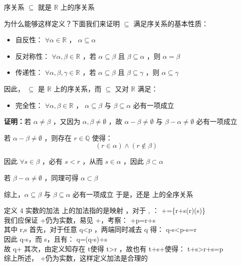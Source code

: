 \begin{definition}{序关系}
$\subseteq$ 就是 $\mathbb{R}$ 上的序关系
\end{definition}
为什么能够这样定义？下面我们来证明 $\subseteq$  满足序关系的基本性质：
\begin{itemize}
\item 自反性： $\forall \alpha\in\mathbb{R}$ ， $\alpha\subseteq\alpha$
\end{itemize}
\begin{itemize}
\item 
反对称性： $\forall \alpha,\beta\in\mathbb{R}$ ，若 $\alpha\subseteq\beta$ 且 $\beta\subseteq\alpha$ ，则 $\alpha=\beta$ 
\end{itemize}

\begin{itemize}
\item 传递性： $\forall \alpha,\beta,\gamma \in \mathbb{R}$ ，若 $\alpha\subseteq\beta$ 且 $\beta\subseteq\gamma$ ，则 $\alpha\subseteq\gamma$ 
\end{itemize}

因此， $\subseteq$ 是 $\mathbb{R}$ 上的序关系，而 $\subseteq$ 又对 $\mathbb{R}$ 满足：

\begin{itemize}
\item 完全性： $\forall \alpha,\beta \in\mathbb{R}$ ， $\alpha\subseteq \beta$  与 $\beta\subseteq \alpha$  必有一项成立
\end{itemize}

\textbf{证明：}若 $\alpha\neq\beta$ ，又因为 $\alpha,\beta\neq\emptyset$ ，故 $\alpha-\beta\neq \emptyset$ 与 $\beta-\alpha \neq \emptyset$ 必有一项成立

若 $\alpha-\beta\neq\emptyset$ ，则存在 $r\in\mathbb{Q}$ 使得：
$$(r\in\alpha)\wedge (r\notin\beta)$$

因此 $\forall s\in\beta$ ，必有 $s<r$ ，从而 $s\in\alpha$ ，因此 $\beta\subset \alpha$

若 $\beta-\alpha\neq\emptyset$ ，同理可得 $\alpha\subset \beta$

综上，$\alpha\subseteq \beta$   与 $\beta\subseteq \alpha$  必有一项成立
于是，\subseteq 还是  上的全序关系


定义 4  实数的加法
 上的加法指的是映射 \times{}\to{} ，对于 \alpha,\beta\in{} ：
 \alpha+\beta=\{r+s\mid(r\in\alpha)\wedge(s\in\beta)\}\\ 
我们应保证 \alpha+\beta 仍为实数，易见 \alpha+\beta\neq \emptyset ，考察：
\alpha+\beta\ni p=r+s\\ 
其中 r\in\alpha,s\in\beta 
首先，对于任意 \ni q<p ，两端同时减去 q 得：
q-s<p-s=r \\ 
因此 q-s\in\alpha，而 s\in\beta ，且有：
q=(q-s)+s\\ 
故 q\in\alpha+\beta 
其次，由定义知存在 t\in\alpha 使得 t>r ，故也有 t+s\in\alpha+\beta 使得：
t+s>r+s=p\\ 
综上所述， \alpha+\beta 仍为实数，这样定义加法是合理的

